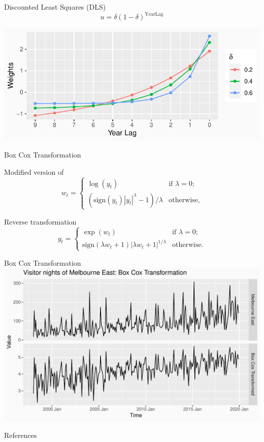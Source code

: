 \documentclass[14pt,ignorenonframetext,]{beamer}
\newif\ifbibliography
\begin{document}
\begin{frame}{Discounted Least Squares (DLS)}
\protect\hypertarget{discounted-least-squares-dls-1}{}
\[
u = \delta(1-\delta)^{\text{YearLag}}
\]

\begin{center}
\includegraphics[width=\linewidth]{plot/p_dls}
\end{center}
\end{frame}

\begin{frame}{Box Cox Transformation}
\protect\hypertarget{box-cox-transformation}{}
\begin{block}{Modified version of \citet{Bickel1981-hv}}
\protect\hypertarget{modified-version-of-bickel1981-hv}{}
\[
w_t  =
\begin{cases}
\log(y_t) & \text{if } \lambda=0;  \\
(\text{sign}(y_t)|y_t|^\lambda-1)/\lambda & \text{otherwise},
\end{cases}
\]
\end{block}

\begin{block}{Reverse transformation}
\protect\hypertarget{reverse-transformation}{}
\[
y_{t} =
\begin{cases}
\exp(w_{t}) & \text{if } \lambda=0;\\
\text{sign}(\lambda w_t+1)|\lambda w_t+1|^{1/\lambda} & \text{otherwise}.
\end{cases}
\]
\end{block}
\end{frame}

\begin{frame}{Box Cox Transformation}
\protect\hypertarget{box-cox-transformation-1}{}
\includegraphics[width=\linewidth]{plot/p_boxcox}
\end{frame}

                    \renewcommand\refname{References}
              \begin{frame}[allowframebreaks]{References}
    \fontsize{9}{10}\selectfont
    \bibliographytrue
    
    \end{frame}
  
\end{document}
